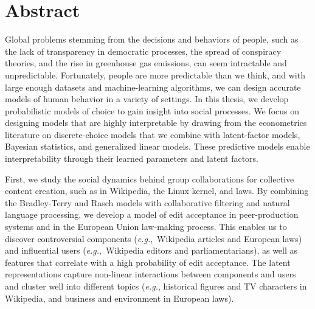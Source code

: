 \cleardoublepage
\chapter*{Abstract}

Global problems stemming from the decisions and behaviors of people, such as the lack of transparency in democratic processes, the spread of conspiracy theories, and the rise in greenhouse gas emissions, can seem intractable and unpredictable.
Fortunately, people are more predictable than we think, and with large enough datasets and machine-learning algorithms, we can design accurate models of human behavior in a variety of settings.
In this thesis, we develop probabilistic models of choice to gain insight into social processes.
We focus on designing models that are highly interpretable by drawing from the econometrics literature on discrete-choice models that we combine with latent-factor models, Bayesian statistics, and generalized linear models.
These predictive models enable interpretability through their learned parameters and latent factors.

First, we study the social dynamics behind group collaborations for collective content creation, such as in Wikipedia, the Linux kernel, and laws.
By combining the Bradley-Terry and Rasch models with collaborative filtering and natural language processing, we develop a model of edit acceptance in peer-production systems and in the European Union law-making process.
This enables us to discover controversial components (\textit{e.g.},~Wikipedia articles and European laws) and influential users (\textit{e.g.},~Wikipedia editors and parliamentarians), as well as features that correlate with a high probability of edit acceptance.
The latent representations capture non-linear interactions between components and users and cluster well into different topics (\textit{e.g.}, historical figures and TV characters in Wikipedia, and business and environment in European laws).

